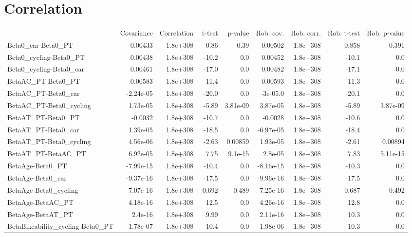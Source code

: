 \section{Correlation}
\begin{tabular}{lrrrrrrrr}
 & Covariance & Correlation & t-test & p-value & Rob. cov. & Rob. corr. & Rob. t-test & Rob. p-value \\
Beta0_car-Beta0_PT & 0.00433 & 1.8e+308 & -0.86 & 0.39 & 0.00502 & 1.8e+308 & -0.858 & 0.391 \\
Beta0_cycling-Beta0_PT & 0.00438 & 1.8e+308 & -10.2 & 0.0 & 0.00452 & 1.8e+308 & -10.1 & 0.0 \\
Beta0_cycling-Beta0_car & 0.00461 & 1.8e+308 & -17.0 & 0.0 & 0.00482 & 1.8e+308 & -17.1 & 0.0 \\
BetaAC_PT-Beta0_PT & -0.00583 & 1.8e+308 & -11.4 & 0.0 & -0.00593 & 1.8e+308 & -11.3 & 0.0 \\
BetaAC_PT-Beta0_car & -2.24e-05 & 1.8e+308 & -20.0 & 0.0 & -3e-05.0 & 1.8e+308 & -20.1 & 0.0 \\
BetaAC_PT-Beta0_cycling & 1.73e-05 & 1.8e+308 & -5.89 & 3.81e-09 & 3.87e-05 & 1.8e+308 & -5.89 & 3.87e-09 \\
BetaAT_PT-Beta0_PT & -0.0032 & 1.8e+308 & -10.7 & 0.0 & -0.0028 & 1.8e+308 & -10.6 & 0.0 \\
BetaAT_PT-Beta0_car & 1.39e-05 & 1.8e+308 & -18.5 & 0.0 & -6.97e-05 & 1.8e+308 & -18.4 & 0.0 \\
BetaAT_PT-Beta0_cycling & 4.56e-06 & 1.8e+308 & -2.63 & 0.00859 & 1.93e-05 & 1.8e+308 & -2.61 & 0.00894 \\
BetaAT_PT-BetaAC_PT & 6.92e-05 & 1.8e+308 & 7.75 & 9.1e-15 & 2.8e-05 & 1.8e+308 & 7.83 & 5.11e-15 \\
BetaAge-Beta0_PT & -7.99e-15 & 1.8e+308 & -10.4 & 0.0 & -8.16e-15 & 1.8e+308 & -10.3 & 0.0 \\
BetaAge-Beta0_car & -9.37e-16 & 1.8e+308 & -17.5 & 0.0 & -9.96e-16 & 1.8e+308 & -17.5 & 0.0 \\
BetaAge-Beta0_cycling & -7.07e-16 & 1.8e+308 & -0.692 & 0.489 & -7.25e-16 & 1.8e+308 & -0.687 & 0.492 \\
BetaAge-BetaAC_PT & 4.18e-16 & 1.8e+308 & 12.5 & 0.0 & 4.26e-16 & 1.8e+308 & 12.8 & 0.0 \\
BetaAge-BetaAT_PT & 2.4e-16 & 1.8e+308 & 9.99 & 0.0 & 2.11e-16 & 1.8e+308 & 10.3 & 0.0 \\
BetaBikeability_cycling-Beta0_PT & 1.78e-07 & 1.8e+308 & -10.4 & 0.0 & 1.98e-06 & 1.8e+308 & -10.3 & 0.0 \\

\end{tabular}
